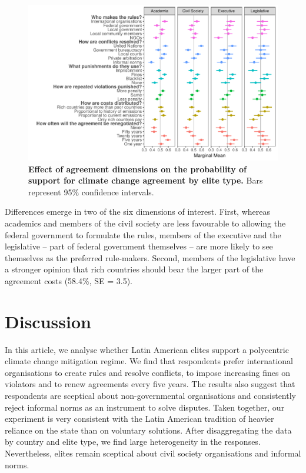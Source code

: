 \documentclass[a4paper,12pt]{article}
\begin{document}
\begin{figure}[H]
	\centering
	\includegraphics[width=\linewidth]{types.pdf}
	\caption{\textbf{Effect of agreement dimensions on the probability of support for climate change agreement by elite type.} Bars represent 95\% confidence intervals.}
	\label{fig:types}
\end{figure}

Differences emerge in two of the six dimensions of interest. First, whereas academics and members of the civil society are less favourable to allowing the federal government to formulate the rules, members of the executive and the legislative -- part of federal government themselves -- are more likely to see themselves as the preferred rule-makers. Second, members of the legislative have a stronger opinion that rich countries should bear the larger part of the agreement costs (58.4\%, SE = 3.5). 

\section{Discussion}
\label{sec:discussion}

In this article, we analyse whether Latin American elites support a polycentric climate change mitigation regime. We find that respondents prefer international organisations to create rules and resolve conflicts, to impose increasing fines on violators and to renew agreements every five years.  The results also suggest that respondents are sceptical about non-governmental organisations and consistently reject informal norms as an instrument to solve disputes. Taken together, our experiment is very consistent with the Latin American tradition of heavier reliance on the state than on voluntary solutions. After disaggregating the data by country and elite type, we find large heterogeneity in the responses. Nevertheless, elites remain sceptical about civil society organisations and informal norms. 
\end{document}
